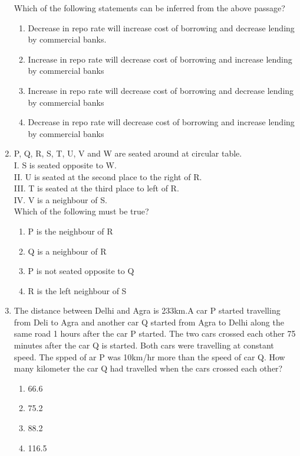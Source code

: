 \documentclass[journal,12pt,onecolumn]{IEEEtran}
\theoremstyle{remark}
\begin{document}
\begin{enumerate}
Which of the following statements can be inferred from the above passage?
\begin{enumerate}
    \item Decrease in repo rate will increase cost of borrowing and decrease lending by commercial banks.
    \item Increase in repo rate will decrease cost of borrowing and increase lending by commercial banks
    \item Increase in repo rate will decrease cost of borrowing and decrease lending by commercial banks
    \item Decrease in repo rate will decrease cost of borrowing and increase lending by commercial banks
\end{enumerate}

\item P, Q, R, S, T, U, V and W are seated around at circular table.\\
    I. S is seated opposite to W. \\
    II. U is seated at the second place to the right of R.\\
    III. T is seated at the third place to left of R.\\
    IV. V is a neighbour of S.\\
Which of the following must be true?
\begin{enumerate}
    \item P is the neighbour of R
    \item Q is a neighbour of R
    \item P is not seated opposite to Q
    \item R is the left neighbour of S
\end{enumerate}

\item The distance between Delhi and Agra is 233km.A car P started travelling from Deli to Agra and another car Q started from Agra to Delhi along the same road 1 hours after the car P started. The two cars crossed each other 75 minutes after the car Q is started. Both cars were travelling at constant speed. The spped of ar P was 10km/hr more than the speed of car Q. How many kilometer the car Q had travelled when the cars crossed each other?
\begin{enumerate}
    \item 66.6
    \item 75.2
    \item 88.2
    \item 116.5
\end{enumerate}


\end{enumerate}
\end{document}
